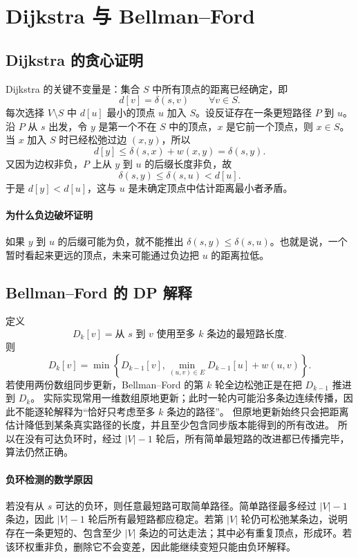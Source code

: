 \documentclass[UTF8,openany,12pt]{ctexbook}
\theoremstyle{remark}
\begin{document}
\section{Dijkstra 与 Bellman--Ford}
\subsection{Dijkstra 的贪心证明}
Dijkstra 的关键不变量是：集合 $S$ 中所有顶点的距离已经确定，即
\[
d[v]=\delta(s,v)\qquad \forall v\in S.
\]
每次选择 $V\setminus S$ 中 $d[u]$ 最小的顶点 $u$ 加入 $S$。设反证存在一条更短路径 $P$ 到 $u$。沿 $P$ 从 $s$ 出发，令 $y$ 是第一个不在 $S$ 中的顶点，$x$ 是它前一个顶点，则 $x\in S$。当 $x$ 加入 $S$ 时已经松弛过边 $(x,y)$，所以
\[
d[y]\le \delta(s,x)+w(x,y)=\delta(s,y).
\]
又因为边权非负，$P$ 上从 $y$ 到 $u$ 的后缀长度非负，故
\[
\delta(s,y)\le \delta(s,u)<d[u].
\]
于是 $d[y]<d[u]$，这与 $u$ 是未确定顶点中估计距离最小者矛盾。

\paragraph{为什么负边破坏证明}
如果 $y$ 到 $u$ 的后缀可能为负，就不能推出 $\delta(s,y)\le \delta(s,u)$。也就是说，一个暂时看起来更远的顶点，未来可能通过负边把 $u$ 的距离拉低。

\subsection{Bellman--Ford 的 DP 解释}
定义
\[
D_k[v]=\text{从 }s\text{ 到 }v\text{ 使用至多 }k\text{ 条边的最短路长度}.
\]
则
\[
D_k[v]=\min\left\{D_{k-1}[v],\min_{(u,v)\in E}D_{k-1}[u]+w(u,v)\right\}.
\]
若使用两份数组同步更新，Bellman--Ford 的第 $k$ 轮全边松弛正是在把 $D_{k-1}$ 推进到 $D_k$。
实际实现常用一维数组原地更新；此时一轮内可能沿多条边连续传播，因此不能逐轮解释为“恰好只考虑至多 $k$ 条边的路径”。
但原地更新始终只会把距离估计降低到某条真实路径的长度，并且至少包含同步版本能得到的所有改进。
所以在没有可达负环时，经过 $|V|-1$ 轮后，所有简单最短路的改进都已传播完毕，算法仍然正确。

\paragraph{负环检测的数学原因}
若没有从 $s$ 可达的负环，则任意最短路可取简单路径。简单路径最多经过 $|V|-1$ 条边，因此 $|V|-1$ 轮后所有最短路都应稳定。若第 $|V|$ 轮仍可松弛某条边，说明存在一条更短的、包含至少 $|V|$ 条边的可达走法；其中必有重复顶点，形成环。若该环权重非负，删除它不会变差，因此能继续变短只能由负环解释。
\end{document}
